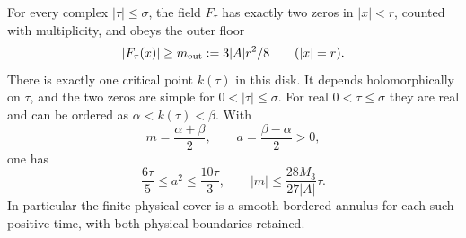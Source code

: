 \begin{theorem}\label{thm:eventchart}
For every complex $|\tau|\leq\sigma$, the field $F_\tau$ has exactly
two zeros in $|x|<r$, counted with multiplicity, and obeys the outer floor
\begin{equation}\label{eq:outerfloor}
 |F_\tau(x)|\geq m_{\rm out}:=3|A|r^2/8
                                      \qquad(|x|=r).
\end{equation}
There is exactly one critical point $k(\tau)$ in this disk. It depends
holomorphically on $\tau$, and the two zeros are simple for
$0<|\tau|\leq\sigma$. For real $0<\tau\leq\sigma$ they are real
and can be ordered as $\alpha<k(\tau)<\beta$. With
\begin{equation}\label{eq:eventmidpoint}
 m=\frac{\alpha+\beta}{2},\qquad a=\frac{\beta-\alpha}{2}>0,
\end{equation}
one has
\begin{equation}\label{eq:splitbounds}
 \frac{6\tau}{5}\leq a^2\leq\frac{10\tau}{3},\qquad
 |m|\leq\frac{28M_3}{27|A|}\tau.
\end{equation}
In particular the finite physical cover is a smooth bordered annulus
for each such positive time, with both physical boundaries retained.
\end{theorem}
